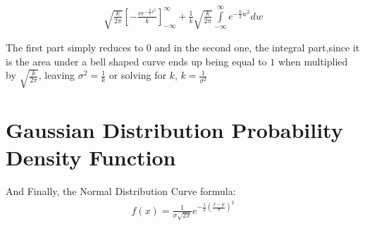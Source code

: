 \documentclass{article}
\begin{document}
\begin{align}
  \sqrt{\frac{k}{2\pi}}\left[ -\frac{ve^{-\frac{k}{2}v^2}}{k} \right] _{-\infty}^{\infty}
  + \frac{1}{k}\sqrt{\frac{k}{2\pi}}\int\limits_{-\infty}^{\infty}e^{-\frac{k}{2}w^2}dw
\end{align}

The first part simply reduces to $0$ and in the second one, the integral
part,since it is the area under a bell shaped curve ends up being equal to $1$
when multiplied by $\sqrt{\frac{k}{2\pi}}$, leaving $\sigma^2=\frac{1}{k}$ or
solving for $k$, $k=\frac{1}{\sigma^2}$

\section{Gaussian Distribution Probability Density Function}

And Finally, the Normal Distribution Curve formula:
\begin{align}
  \label{eq:pdf}
  f(x)=\frac{1}{\sigma\sqrt{2\pi}}e^{-\frac{1}{2}\left( \frac{x-\mu}{\sigma} \right)^2}
\end{align}
\end{document}
